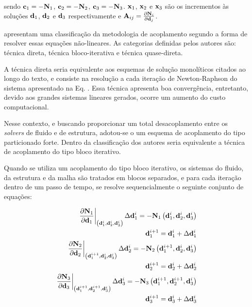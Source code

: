 \documentclass[tese_patricia]{subfiles}
\begin{document}
\noindent sendo $\mathbf{c}_{1} = - \mathbf{N}_{1}$, $\mathbf{c}_{2} = - \mathbf{N}_{2}$, $\mathbf{c}_{3} = - \mathbf{N}_{3}$. $\mathbf{x}_{1}$, $\mathbf{x}_{2}$ e $\mathbf{x}_{3}$ são os incrementos às soluções $\mathbf{d}_{1}$, $\mathbf{d}_{2}$ e $\mathbf{d}_{3}$ respectivamente e $\mathbf{A}_{ij} = \frac{\partial\mathbf{N}_{i}}{\partial\mathbf{d}_{j}}$. 

  apresentam uma classificação da metodologia de acoplamento segundo a forma de resolver essas equações não-lineares. As categorias definidas pelos autores são: técnica direta, técnica bloco-iterativa e técnica quase-direta. 

A técnica direta seria equivalente aos esquemas de solução monolíticos citados ao longo do texto, e consiste na resolução a cada iteração de Newton-Raphson do sistema apresentado na Eq. . Essa técnica apresenta boa convergência, entretanto, devido aos grandes sistemas lineares gerados, ocorre um aumento do custo computacional.

Nesse contexto, e buscando proporcionar um total desacoplamento entre os \textit{solvers} de fluido e de estrutura, adotou-se o um esquema de acoplamento do tipo particionado forte. Dentro da classificação dos autores  seria equivalente a técnica de acoplamento do tipo bloco iterativo.

Quando se utiliza um acoplamento do tipo bloco iterativo, os sistemas do fluido, da estrutura e da malha são tratados em blocos separados, e para cada iteração dentro de um passo de tempo, se resolve sequencialmente o seguinte conjunto de equações:


\begin{align}
	\left .\frac{\partial\mathbf{N}_{1}}{\partial\mathbf{d}_{1}}\right|_{\left(\mathbf{d}_{1}^{i},\mathbf{d}_{2}^{i},\mathbf{d}_{3}^{i}\right)} \Delta\mathbf{d}_{1}^{i} = - \mathbf{N}_{1}\left(\mathbf{d}_{1}^{i},\mathbf{d}_{2}^{i},\mathbf{d}_{3}^{i}\right)  \label{eq:lin_fluido} \\
	\mathbf{d}_{1}^{i+1} =  \mathbf{d}_{1}^{i} + \Delta\mathbf{d}_{1}^{i} \label{eq:atu_fluido}	\\
	\left.\frac{\partial\mathbf{N}_{2}}{\partial\mathbf{d}_{2}}\right|_{\left(\mathbf{d}_{1}^{i+1},\mathbf{d}_{2}^{i},\mathbf{d}_{3}^{i}\right)} \Delta\mathbf{d}_{2}^{i} = - \mathbf{N}_{2}\left(\mathbf{d}_{1}^{i+1},\mathbf{d}_{2}^{i},\mathbf{d}_{3}^{i}\right) \label{eq:lin_est}\\
	\mathbf{d}_{2}^{i+1} =  \mathbf{d}_{2}^{i} + \Delta\mathbf{d}_{2}^{i} \label{eq:atu_est}\\
	\left.\frac{\partial\mathbf{N}_{3}}{\partial\mathbf{d}_{3}}\right|_{\left(\mathbf{d}_{1}^{i+1},\mathbf{d}_{2}^{i+1},\mathbf{d}_{3}^{i}\right)} \Delta\mathbf{d}_{3}^{i} = - \mathbf{N}_{3}\left(\mathbf{d}_{1}^{i+1},\mathbf{d}_{2}^{i+1},\mathbf{d}_{3}^{i}\right) \label{eq:lin_malha}\\
	\mathbf{d}_{3}^{i+1} =  \mathbf{d}_{3}^{i} + \Delta\mathbf{d}_{3}^{i}  \label{eq:atu_malha}
\end{align}
\end{document}
